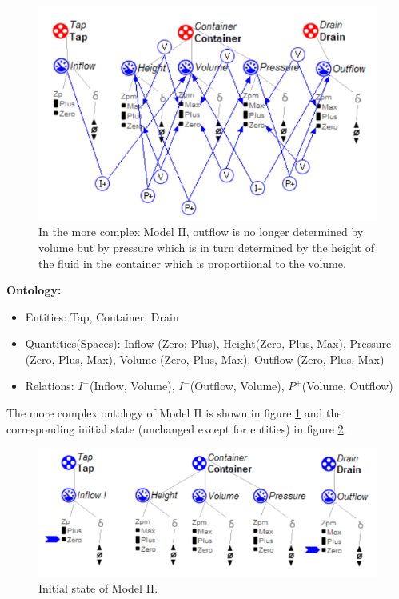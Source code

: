\documentclass{article}
\begin{document}
\begin{figure}[!h]
	\centering
	\includegraphics{Extra_Flow.png}
	\caption{In the more complex Model II, outflow is no longer determined by volume but by pressure which is in turn determined by the height of the fluid in the container which is proportiional to the volume.}
	\label{figure3}
\end{figure}

\textbf{Ontology:}
\begin{itemize}
	\item Entities: Tap, Container, Drain
	\item Quantities(Spaces): Inflow (Zero; Plus), Height(Zero, Plus, Max), Pressure (Zero, Plus, Max), Volume (Zero, Plus, Max), Outflow (Zero, Plus, Max)
	\item Relations: $I^+$(Inflow, Volume), $I^-$(Outflow, Volume), $P^+$(Volume, Outflow)
\end{itemize}

The more complex ontology of Model II is shown in figure \ref{figure3} and the corresponding initial state (unchanged except for entities) in figure \ref{figure4}.

\begin{figure}[!h]
	\centering
	\includegraphics{Scenario_2.png}
	\caption{Initial state of Model II.}
	\label{figure4}
\end{figure}
\end{document}
